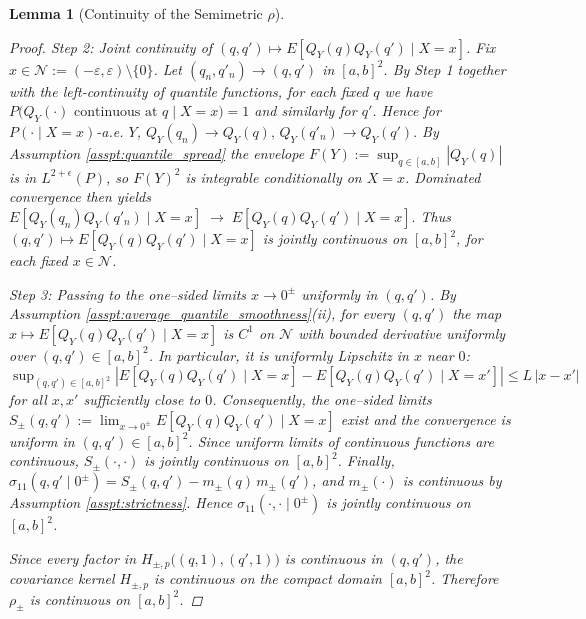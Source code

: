 \documentclass[12pt]{article}
\newtheorem{lemma}{Lemma}
\begin{document}
\begin{lemma}[Continuity of the Semimetric \(\rho\)]
\begin{proof}
\emph{Step 2: Joint continuity of \((q,q')\mapsto E[Q_Y(q)Q_Y(q')\mid X=x]\).}  
Fix \(x\in\mathcal N :=(-\varepsilon,\varepsilon)\setminus\{0\}\). Let \((q_n,q'_n)\to(q,q')\) in \([a,b]^2\). By Step 1 together with the left-continuity of quantile functions, for each fixed \(q\) we have \(P\big(Q_Y(\cdot)\text{ continuous at }q\mid X=x\big)=1\) and similarly for \(q'\). Hence for \(P(\cdot\mid X=x)\)-a.e. \(Y\),  
\(Q_Y(q_n)\to Q_Y(q), \, Q_Y(q'_n)\to Q_Y(q') .\)  
By Assumption \ref{asspt:quantile_spread} the envelope \(F(Y):=\sup_{q\in[a,b]}|Q_Y(q)|\) is in \(L^{2+\epsilon}(P)\), so \(F(Y)^2\) is integrable conditionally on \(X=x\). Dominated convergence then yields  
\(E[Q_Y(q_n)Q_Y(q'_n)\mid X=x]\;\longrightarrow\;E[Q_Y(q)Q_Y(q')\mid X=x] .\)  
Thus \((q,q')\mapsto E[Q_Y(q)Q_Y(q')\mid X=x]\) is jointly continuous on \([a,b]^2\), for each fixed \(x\in\mathcal N\).

\emph{Step 3: Passing to the one–sided limits \(x\to 0^\pm\) uniformly in \((q,q')\).}  
By Assumption \ref{asspt:average_quantile_smoothness}(ii), for every \((q,q')\) the map  
\(x\longmapsto E[Q_Y(q)Q_Y(q')\mid X=x]\)  
is \(C^1\) on \(\mathcal N\) with bounded derivative uniformly over \((q,q')\in[a,b]^2\). In particular, it is uniformly Lipschitz in \(x\) near \(0\):  
\(\sup_{(q,q')\in[a,b]^2}\left|E[Q_Y(q)Q_Y(q')\mid X=x]-E[Q_Y(q)Q_Y(q')\mid X=x']\right|\le L\,|x-x'|\)  
for all \(x,x'\) sufficiently close to \(0\). Consequently, the one–sided limits  
\(S_\pm(q,q'):=\lim_{x\to 0^\pm}E[Q_Y(q)Q_Y(q')\mid X=x]\)  
exist and the convergence is uniform in \((q,q')\in[a,b]^2\). Since uniform limits of continuous functions are continuous, \(S_\pm(\cdot,\cdot)\) is jointly continuous on \([a,b]^2\).  
Finally,  
\(\sigma_{11}(q,q'\mid 0^\pm) = S_\pm(q,q')-m_\pm(q)\,m_\pm(q')\),  
and \(m_\pm(\cdot)\) is continuous by Assumption \ref{asspt:strictness}. Hence \(\sigma_{11}(\cdot,\cdot\mid 0^\pm)\) is jointly continuous on \([a,b]^2\).

Since every factor in \(H_{\pm,p}\big((q,1),(q',1)\big)\) is continuous in \((q,q')\), the covariance kernel \(H_{\pm,p}\) is continuous on the compact domain \([a,b]^2\). Therefore \(\rho_\pm\) is continuous on \([a,b]^2\).
\end{proof}
\end{lemma}
\end{document}
